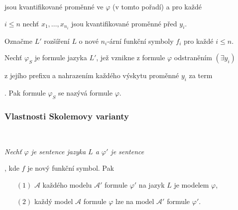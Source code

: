 jsou  kvantifikované proměnné ve $\varphi$ (v tomto pořadí) a pro každé
\smallskip

$i\le n$ nechť $x_1,\dots,x_{n_i}$ jsou  kvantifikované proměnné před $y_i$.
\smallskip

Označme $L'$ rozšíření $L$ o nové $n_i$-ární funkční symboly $f_i$ pro každé $i\le n$.
\bigskip

Nechť $\varphi_S$ je formule jazyka $L'$, jež vznikne z formule $\varphi$ odstraněním $(\exists y_i)$
\smallskip

 z jejího prefixu a nahrazením každého výskytu proměnné $y_i$ za term
\smallskip

. Pak formule $\varphi_S$ se nazývá  formule $\varphi$.
\bigskip

{\it {}
\vspace{-2mm}

\vspace{-6mm}
\vspace{-2mm}

\vspace{-6mm}
}





\subsubsection*{Vlastnosti Skolemovy varianty}

{\bf {}}\ \ {\it Nechť $\varphi$ je sentence  jazyka $L$ a $\varphi'$ je sentence
\smallskip

 , kde $f$ je nový funkční symbol. Pak
\vspace{0.5mm}

\begin{enumerate}
\item[$(1)$]  $\mathcal{A}$ každého modelu $\mathcal{A'}$ formule $\varphi'$ na jazyk $L$ je modelem $\varphi$,
\vspace{0.5mm}

\item[$(2)$] každý model $\mathcal{A}$ formule $\varphi$ lze  na model $\mathcal{A}'$ formule $\varphi'$.
\end{enumerate}}
\smallskip

